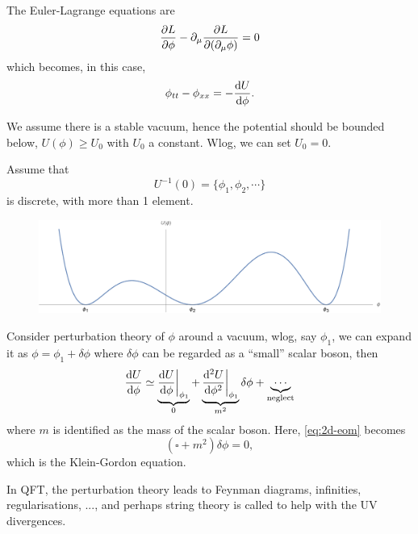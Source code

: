 \documentclass[a4paper,11pt]{article}
\begin{document}
    The Euler-Lagrange equations are 
    \begin{equation}
        \pdv{L}{\phi} - \partial_\mu \pdv{L}{(\partial_\mu \phi)} = 0
    \end{equation}
    which becomes, in this case,
    \begin{equation}
        \phi_{tt} - \phi_{xx} = - \dv{U}{\phi}. \label{eq:2d-eom}
    \end{equation}

    We assume there is a stable vacuum, hence the potential should be bounded below, $U(\phi) \geq U_0$ with $U_0$ a constant. Wlog, we can set $U_0 = 0$. 

    Assume that 
    \begin{equation}
        U^{-1}(0) = \{\phi_1, \phi_2, \cdots\}
    \end{equation}
    is discrete, with more than 1 element.
    \begin{figure}[H]
        \centering
        \includegraphics[width=0.75\linewidth]{fig/fig0.pdf}
    \end{figure}

    Consider perturbation theory of $\phi$ around a vacuum, wlog, say $\phi_1$, we can expand it as $\phi = \phi_1 + \delta \phi$ where $\delta \phi$ can be regarded as a ``small'' scalar boson, then 
    \begin{equation}
        \dv{U}{\phi} \simeq \underbrace{\dv{U}{\phi}\bigg|_{\phi_1}}_{0} + \underbrace{\dv[2]{U}{\phi}\bigg|_{\phi_1}}_{m^2} \delta \phi + \underbrace{\cdots}_{\text{neglect}}
    \end{equation}
    where $m$ is identified as the mass of the scalar boson. Here, \eqref{eq:2d-eom} becomes 
    \begin{equation}
        (\square + m^2) \delta \phi = 0,
    \end{equation}
    which is the Klein-Gordon equation.

    In QFT, the perturbation theory leads to Feynman diagrams, infinities, regularisations, ..., and perhaps string theory is called to help with the UV divergences. 
\end{document}

